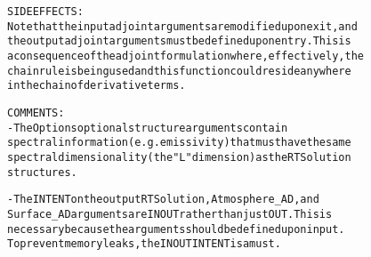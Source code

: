 \begin{alltt}
  SIDE EFFECTS:
       Note that the input adjoint arguments are modified upon exit, and
       the output adjoint arguments must be defined upon entry. This is
       a consequence of the adjoint formulation where, effectively, the
       chain rule is being used and this function could reside anywhere
       in the chain of derivative terms.
 
  COMMENTS:
        - The Options optional structure arguments contain
          spectral information (e.g. emissivity) that must have the same
          spectral dimensionality (the "L" dimension) as the RTSolution
          structures.
 
        - The INTENT on the output RTSolution, Atmosphere_AD, and
          Surface_AD arguments are IN OUT rather than just OUT. This is
          necessary because the arguments should be defined upon input.
          To prevent memory leaks, the IN OUT INTENT is a must.
 
  \end{alltt}
